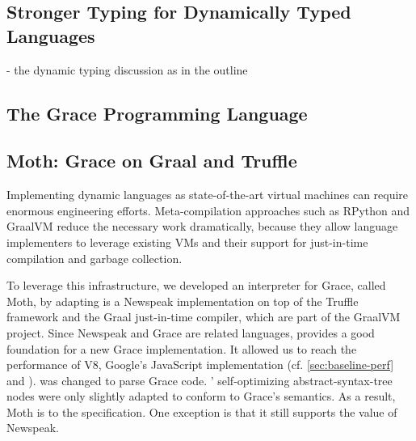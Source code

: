 
\subsection{Stronger Typing for Dynamically Typed Languages}

\begin{cnote}
- the dynamic typing discussion as in the outline
\end{cnote}

\subsection{The Grace Programming Language}



\subsection{Moth: Grace on Graal and Truffle}

Implementing dynamic languages as state-of-the-art virtual machines
can require enormous engineering efforts.
Meta-compilation approaches\citep{Marr:2015:MTPE}
such as RPython\citep{Bolz:2009:TMP,Bolz:2013:IMT}
and GraalVM\citep{Wurthinger2013,Wurthinger:2017:PPE}
reduce the necessary work dramatically,
because they allow language implementers to leverage existing VMs
and their support for just-in-time compilation and garbage collection.

To leverage this infrastructure, we developed an interpreter for Grace,
called Moth, by adapting
\SOMns is a Newspeak implementation\citep{Bracha:10:NS} on top of the Truffle framework and the Graal just-in-time compiler,
which are part of the GraalVM project.
Since Newspeak and Grace are related languages,
\SOMns provides a good foundation for a new Grace implementation.
It allowed us to reach the performance of V8,
Google's JavaScript implementation
(cf. \cref{sec:baseline-perf} and \citet{Marr2016}).
\SOMns was changed to parse Grace code.
\SOMns' self-optimizing abstract-syntax-tree nodes were only slightly adapted to conform to Grace's semantics.
As a result, Moth is  to the specification.
One exception is that it still supports the  value of Newspeak.



